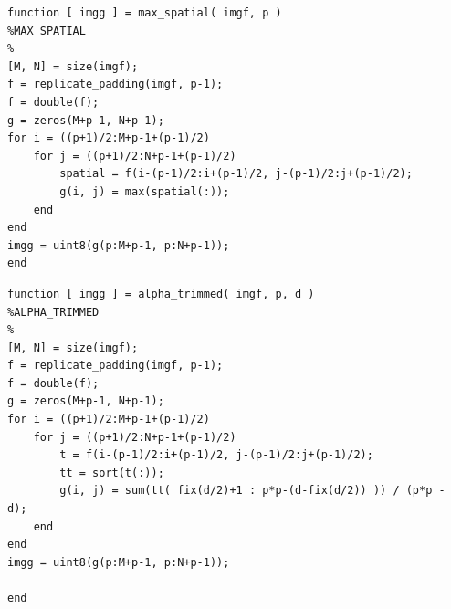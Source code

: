\begin{lstlisting}
function [ imgg ] = max_spatial( imgf, p )
%MAX_SPATIAL
%
[M, N] = size(imgf);
f = replicate_padding(imgf, p-1);
f = double(f);
g = zeros(M+p-1, N+p-1);
for i = ((p+1)/2:M+p-1+(p-1)/2)
    for j = ((p+1)/2:N+p-1+(p-1)/2)
        spatial = f(i-(p-1)/2:i+(p-1)/2, j-(p-1)/2:j+(p-1)/2);
        g(i, j) = max(spatial(:));
    end
end
imgg = uint8(g(p:M+p-1, p:N+p-1));
end
\end{lstlisting}

\begin{lstlisting}
function [ imgg ] = alpha_trimmed( imgf, p, d )
%ALPHA_TRIMMED 
%   
[M, N] = size(imgf);
f = replicate_padding(imgf, p-1);
f = double(f);
g = zeros(M+p-1, N+p-1);
for i = ((p+1)/2:M+p-1+(p-1)/2)
    for j = ((p+1)/2:N+p-1+(p-1)/2)
        t = f(i-(p-1)/2:i+(p-1)/2, j-(p-1)/2:j+(p-1)/2);
        tt = sort(t(:));
        g(i, j) = sum(tt( fix(d/2)+1 : p*p-(d-fix(d/2)) )) / (p*p - d);
    end
end
imgg = uint8(g(p:M+p-1, p:N+p-1));

end
\end{lstlisting}


